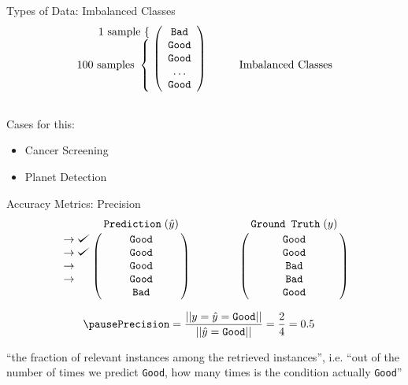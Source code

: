 \documentclass[usenames,dvipsnames]{beamer}
\def\checkmark{\tikz\fill[scale=0.4](0,.35) -- (.25,0) -- (1,.7) -- (.25,.15) -- cycle;}
\begin{document}
\begin{frame}{Types of Data: Imbalanced Classes}
\[
  \begin{array}{@{} c @{}}
    \begin{array}{@{} r @{}}
      \text{1 sample}~\{\hspace{\nulldelimiterspace} \\
      \text{100 samples}~\left\{\begin{array}{@{}c@{}}\null\\\null\\\null\\\null\end{array}\right.
    \end{array}
    \left (
      \begin{array}{ *{1}{c} }
        \texttt{Bad}  \\
        \texttt{Good}  \\
        \texttt{Good}  \\
        \ldots  \\
        \texttt{Good}  \\
      \end{array}
    \right ) \\
    \mathstrut
  \end{array}
  \quad \quad \quad
  \text{Imbalanced Classes}
\]

\pause

Cases for this:
\begin{itemize}%
\item Cancer Screening
\item Planet Detection
\end{itemize}

\end{frame}

\begin{frame}{Accuracy Metrics: Precision}
$$
\bordermatrix{&\texttt{Prediction}\;(\hat{y})\cr
               \rightarrow\checkmark&\texttt{Good}\cr
               \rightarrow\checkmark&\texttt{Good}\cr
                \rightarrow&\texttt{Good}\cr
                \rightarrow&\texttt{Good}\cr
               &\texttt{Bad}}
\qquad \qquad
\bordermatrix{&\texttt{Ground Truth}\;(y)\cr
                &\texttt{Good}\cr
                &\texttt{Good}\cr
                &\texttt{Bad}\cr
                &\texttt{Bad}\cr
                &\texttt{Good}}
$$

\begin{align*}
\pause \texttt{Precision} &= \frac{||y = \hat{y} = \texttt{Good}||}{||\hat{y} = \texttt{Good}||} = \frac{2}{4} = 0.5
\end{align*}

``the fraction of relevant instances among the retrieved instances'', i.e. ``out of the number of times we predict \texttt{Good}, how many times is the condition actually \texttt{Good}''

\end{frame}
\end{document}
